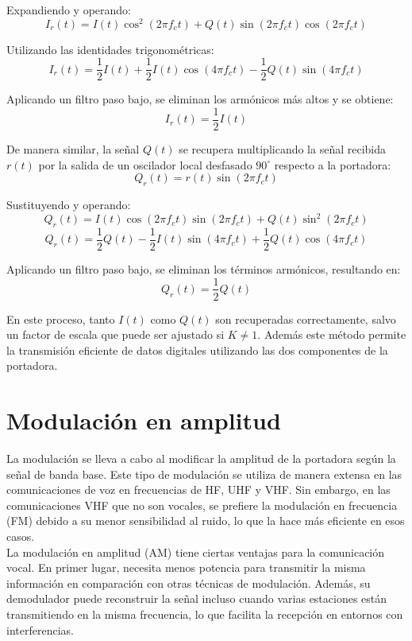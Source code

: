 Expandiendo y operando:
\[
I_r(t) = I(t) \cos^2(2\pi f_c t) + Q(t) \sin(2\pi f_c t) \cos(2\pi f_c t)
\]

Utilizando las identidades trigonométricas:
\[
I_r(t) = \frac{1}{2} I(t) + \frac{1}{2} I(t) \cos(4\pi f_c t) - \frac{1}{2} Q(t) \sin(4\pi f_c t)
\]

Aplicando un filtro paso bajo, se eliminan los armónicos más altos y se obtiene:
\[
I_r(t) = \frac{1}{2} I(t)
\]

De manera similar, la señal \( Q(t) \) se recupera multiplicando la señal recibida \( r(t) \) por la salida de un oscilador local desfasado \(90^\circ\) respecto a la portadora:
\[
Q_r(t) = r(t) \sin(2\pi f_c t)
\]

Sustituyendo y operando:
\[
Q_r(t) = I(t) \cos(2\pi f_c t) \sin(2\pi f_c t) + Q(t) \sin^2(2\pi f_c t)
\]
\[
Q_r(t) = \frac{1}{2} Q(t) - \frac{1}{2} I(t) \sin(4\pi f_c t) + \frac{1}{2} Q(t) \cos(4\pi f_c t)
\]

Aplicando un filtro paso bajo, se eliminan los términos armónicos, resultando en:
\[
Q_r(t) = \frac{1}{2} Q(t)
\]

En este proceso, tanto \( I(t) \) como \( Q(t) \) son recuperadas correctamente, salvo un factor de escala que puede ser ajustado si \( K \neq 1 \). Además este método permite la transmisión eficiente de datos digitales utilizando las dos componentes de la portadora.

\section{Modulación en amplitud}
La modulación se lleva a cabo al modificar la amplitud de la portadora según la señal de banda base. Este tipo de modulación se utiliza de manera extensa en las comunicaciones de voz en frecuencias de HF, UHF y VHF. Sin embargo, en las comunicaciones VHF que no son vocales, se prefiere la modulación en frecuencia (FM) debido a su menor sensibilidad al ruido, lo que la hace más eficiente en esos casos.\\

La modulación en amplitud (AM) tiene ciertas ventajas para la comunicación vocal. En primer lugar, necesita menos potencia para transmitir la misma información en comparación con otras técnicas de modulación. Además, su demodulador puede reconstruir la señal incluso cuando varias estaciones están transmitiendo en la misma frecuencia, lo que facilita la recepción en entornos con interferencias.\\

